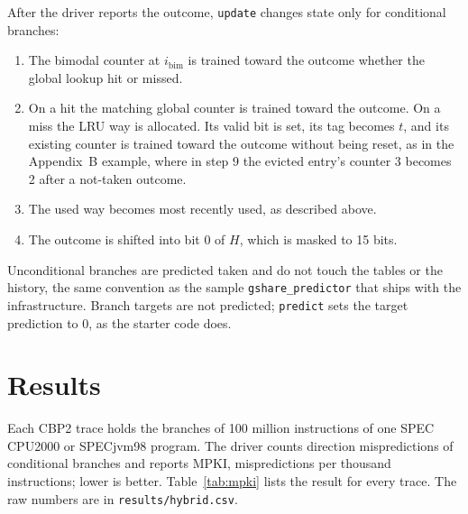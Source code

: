 \documentclass[11pt]{article}
\newcommand{\code}[1]{\texttt{#1}}
\begin{document}
After the driver reports the outcome, \code{update} changes state only for conditional branches:
\begin{enumerate}
  \item The bimodal counter at $i_{\mathrm{bim}}$ is trained toward the outcome whether the
    global lookup hit or missed.
  \item On a hit the matching global counter is trained toward the outcome. On a miss the LRU
    way is allocated. Its valid bit is set, its tag becomes $t$, and its existing counter is
    trained toward the outcome without being reset, as in the Appendix~B example, where in
    step 9 the evicted entry's counter 3 becomes 2 after a not-taken outcome.
  \item The used way becomes most recently used, as described above.
  \item The outcome is shifted into bit 0 of $H$, which is masked to 15 bits.
\end{enumerate}
Unconditional branches are predicted taken and do not touch the tables or the history, the same
convention as the sample \code{gshare\_predictor} that ships with the infrastructure. Branch
targets are not predicted; \code{predict} sets the target prediction to 0, as the starter code
does.

\section{Results}
\label{sec:results}

Each CBP2 trace holds the branches of 100 million instructions of one SPEC CPU2000 or SPECjvm98
program. The driver counts direction mispredictions of conditional branches and reports MPKI,
mispredictions per thousand instructions; lower is better. Table~\ref{tab:mpki} lists the
result for every trace. The raw numbers are in \code{results/hybrid.csv}.
\end{document}
